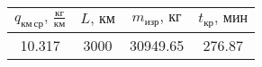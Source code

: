 \begin{tabular}{|c|c|c|c|}
\hline
$q_{км\, ср},\, \frac{кг}{км}$ & $L,\, км$ & $m_{изр},\, кг$ & $t_{кр},\, мин$ \\ 
\hline
10.317 & 3000 & 30949.65 & 276.87 \\ 
\hline
\end{tabular}